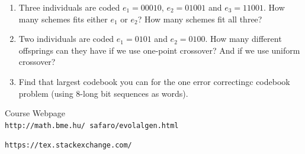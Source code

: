 \documentclass[12pt,english]{article}
\newenvironment{statement}{\fontfamily{ptm}\selectfont}{\par}
\begin{document}
\begin{enumerate}

	\item
		\begin{statement}
		Three individuals are coded $e_1 = 00010$, $e_2 = 01001$ and $e_3 = 11001$. How many schemes fits either $e_1$ or $e_2$? How many schemes fit all three?
		\end{statement}


	\item
		\begin{statement}
		Two individuals are coded $e_1 = 0101$ and $e_2 = 0100$. How many different offsprings can they have if we use one-point crossover? And if we use uniform crossover?
		\end{statement}


	\item
		\begin{statement}
		Find that largest codebook you can for the one error correctingc codebook problem (using 8-long bit sequences as words).
		\end{statement}


\end{enumerate}


\begin{thebibliography}{9}

Course Webpage
\\\texttt{http://math.bme.hu/~safaro/evolalgen.html}


\texttt{https://tex.stackexchange.com/}


\end{thebibliography}
\end{document}
